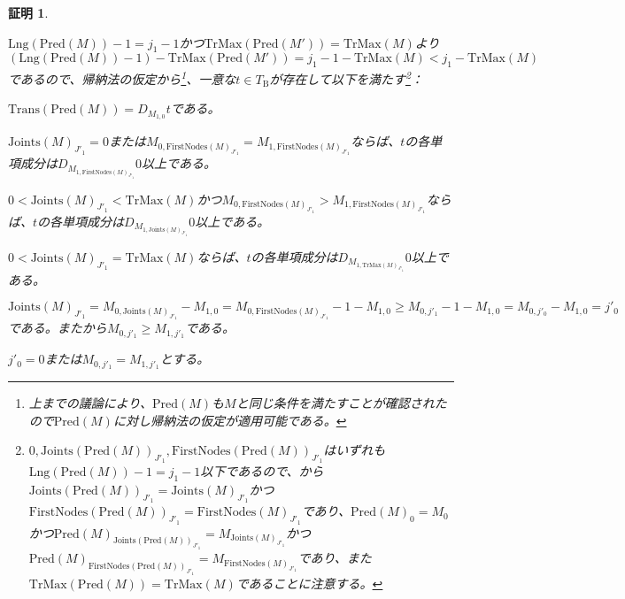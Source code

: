 \documentclass[dvipdfmx,uplatex]{jsarticle}
\theoremstyle{customnonumberbreakfortheorem}
\theoremstyle{customnonumberbreakforproof}
\newtheorem{hideableproof}{証明}
\begin{document}
\begin{hideableproof}
\begin{indented}
\begin{indented}
			\item \(\textrm{Lng}(\textrm{Pred}(M))-1 = j_1-1\)かつ\(\textrm{TrMax}(\textrm{Pred}(M')) = \textrm{TrMax}(M)\)より\((\textrm{Lng}(\textrm{Pred}(M))-1) - \textrm{TrMax}(\textrm{Pred}(M')) = j_1-1 - \textrm{TrMax}(M) < j_1 - \textrm{TrMax}(M)\)であるので、帰納法の仮定から\footnote{上までの議論により、\(\textrm{Pred}(M)\)も\(M\)と同じ条件を満たすことが確認されたので\(\textrm{Pred}(M)\)に対し帰納法の仮定が適用可能である。}、一意な\(t \in T_{\textrm{B}}\)が存在して以下を満たす\footnote{\(0, \textrm{Joints}(\textrm{Pred}(M))_{J'_1}, \textrm{FirstNodes}(\textrm{Pred}(M))_{J'_1}\)はいずれも\(\textrm{Lng}(\textrm{Pred}(M))-1 = j_1-1\)以下であるので、から\(\textrm{Joints}(\textrm{Pred}(M))_{J'_1} = \textrm{Joints}(M)_{J'_1}\)かつ\(\textrm{FirstNodes}(\textrm{Pred}(M))_{J'_1} = \textrm{FirstNodes}(M)_{J'_1}\)であり、\(\textrm{Pred}(M)_0 = M_0\)かつ\(\textrm{Pred}(M)_{\textrm{Joints}(\textrm{Pred}(M))_{J'_1}} = M_{\textrm{Joints}(M)_{J'_1}}\)かつ\(\textrm{Pred}(M)_{\textrm{FirstNodes}(\textrm{Pred}(M))_{J'_1}} = M_{\textrm{FirstNodes}(M)_{J'_1}}\)であり、また\(\textrm{TrMax}(\textrm{Pred}(M)) = \textrm{TrMax}(M)\)であることに注意する。}：
			\begin{penumerate}
				\item \(\textrm{Trans}(\textrm{Pred}(M)) = D_{M_{1,0}} t\)である。
				\item \(\textrm{Joints}(M)_{J'_1} = 0\)または\(M_{0,\textrm{FirstNodes}(M)_{J'_1}} = M_{1,\textrm{FirstNodes}(M)_{J'_1}}\)ならば、\(t\)の各単項成分は\(D_{M_{1,\textrm{FirstNodes}(M)_{J'_1}}} 0\)以上である。
				\item \(0 < \textrm{Joints}(M)_{J'_1} < \textrm{TrMax}(M)\)かつ\(M_{0,\textrm{FirstNodes}(M)_{J'_1}} > M_{1,\textrm{FirstNodes}(M)_{J'_1}}\)ならば、\(t\)の各単項成分は\(D_{M_{1,\textrm{Joints}(M)_{J'_1}}} 0\)以上である。
				\item \(0 < \textrm{Joints}(M)_{J'_1} = \textrm{TrMax}(M)\)ならば、\(t\)の各単項成分は\(D_{M_{1,\textrm{TrMax}(M)_{J'_1}}} 0\)以上である。
			\end{penumerate}
			\item \(\textrm{Joints}(M)_{J'_1} = M_{0,\textrm{Joints}(M)_{J'_1}}-M_{1,0} = M_{0,\textrm{FirstNodes}(M)_{J'_1}}-1-M_{1,0} \geq M_{0,j'_1}-1-M_{1,0} = M_{0,j'_0}-M_{1,0} = j'_0\)である。またから\(M_{0,j'_1} \geq M_{1,j'_1}\)である。
			\item \(j'_0 = 0\)または\(M_{0,j'_1} = M_{1,j'_1}\)とする。
			\begin{penumerate}

\end{penumerate}
\end{indented}
\end{indented}
\end{hideableproof}
\end{document}
